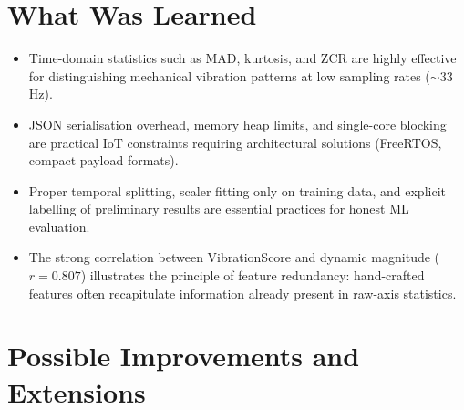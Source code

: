 \documentclass[12pt,a4paper]{report}
\begin{document}
\section{What Was Learned}

\begin{itemize}
  \item Time-domain statistics such as MAD, kurtosis, and ZCR are highly
        effective for distinguishing mechanical vibration patterns at low
        sampling rates ($\sim$33\,Hz).
  \item JSON serialisation overhead, memory heap limits, and single-core
        blocking are practical IoT constraints requiring architectural
        solutions (FreeRTOS, compact payload formats).
  \item Proper temporal splitting, scaler fitting only on training data,
        and explicit labelling of preliminary results are essential practices
        for honest ML evaluation.
  \item The strong correlation between VibrationScore and dynamic magnitude
        ($r = 0.807$) illustrates the principle of feature redundancy:
        hand-crafted features often recapitulate information already present
        in raw-axis statistics.
\end{itemize}

\section{Possible Improvements and Extensions}
\end{document}
